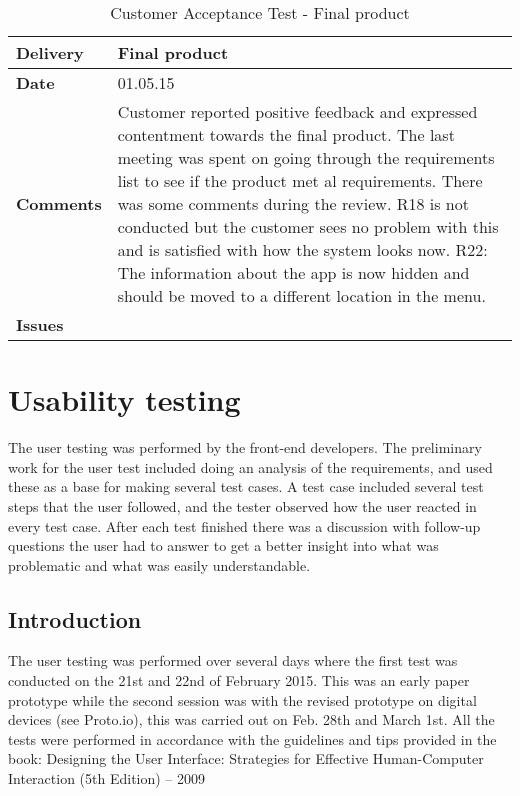 \begin{center}
\begin{longtable}{ | p{4cm} | p{13cm} | }
		
		
	\end{longtable}
\end{center}

\renewcommand{\arraystretch}{2}%
\begin{center}
	\begin{longtable}{ | p{4cm} | p{13cm} | }
		
		\caption[Customer Acceptance Test - Final product]{Customer Acceptance Test - Final product} \label{Tab:cattest5}\\
		\hline
		\textbf{Delivery} & Final product\\ \hline
		\textbf{Date} & 01.05.15 \\ \hline
		\textbf{Comments} & Customer reported positive feedback and expressed contentment towards the final product.  The last meeting was spent on going through the requirements list to see if the product met al requirements. There was some comments during the review. 
		R18 is not conducted but the customer sees no problem with this and is satisfied with how the system looks now. 
		R22: The information about the app is now hidden and should be moved to a different location in the menu.   \\ \hline
		\textbf{Issues} \\ \hline
	\end{longtable}
\end{center}

\section{Usability testing}

The user testing was performed by the front-end developers. The preliminary work for the user test included doing an analysis of the requirements, and used these as a base for making several test cases. 
A test case included several test steps that the user followed, and the tester observed how the user reacted in every test case. After each test finished there was a discussion with follow-up questions the user had to answer to get a better insight into what was problematic and what was easily understandable.

\subsection{Introduction}
The user testing was performed over several days where the first test was conducted on the 21st and 22nd of February 2015. This was an early paper prototype while the second session was with the revised prototype on digital devices (see Proto.io), this was carried out on Feb. 28th and March 1st. All the tests were performed in accordance with the guidelines and tips provided in the book: Designing the User Interface: Strategies for Effective Human-Computer Interaction (5th Edition) – 2009 


